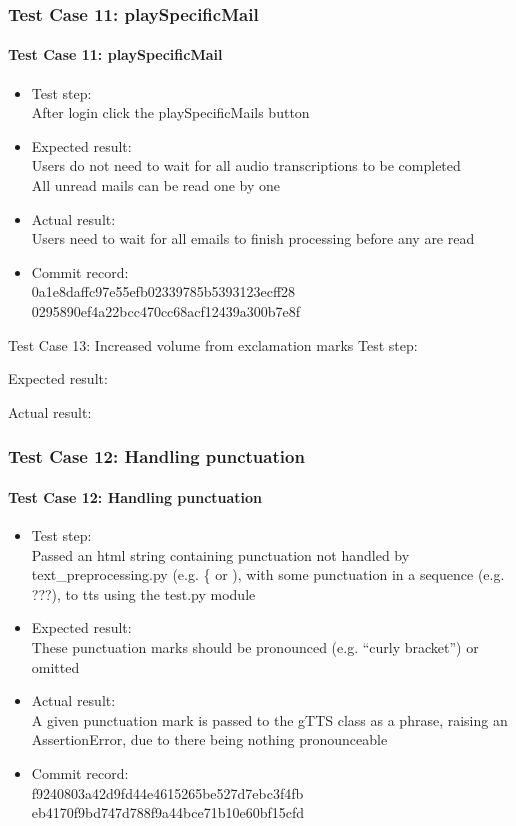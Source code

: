 \documentclass{article}
\begin{document}
\subsubsection{Test Case 11:   playSpecificMail}
\paragraph{Test Case 11:   playSpecificMail}
\begin{itemize}
\item Test step: \\
    After login click the playSpecificMails button
\item Expected result: \\
    Users do not need to wait for all audio transcriptions to be completed \\ 
    All unread mails can be read one by one
\item Actual result: \\
    Users need to wait for all emails to finish processing before any are read
\item Commit record: \\
    0a1e8daffc97e55efb02339785b5393123ecff28 
    0295890ef4a22bcc470cc68acf12439a300b7e8f
\end{itemize}

Test Case 13: Increased volume from exclamation marks
Test step:

Expected result:

Actual result:




\subsubsection{Test Case 12: Handling punctuation}
\paragraph{Test Case 12: Handling punctuation}
\begin{itemize}
\item Test step: \\
    Passed an html string containing punctuation not handled by text\_preprocessing.py (e.g. \{ or \@), with some punctuation in a sequence (e.g. ???), to tts using the test.py module
\item Expected result: \\
    These punctuation marks should be pronounced (e.g. “curly bracket”) or omitted
\item Actual result: \\
    A given punctuation mark is passed to the gTTS class as a phrase, raising an AssertionError, due to there being nothing pronounceable
\item Commit record: \\
    f9240803a42d9fd44e4615265be527d7ebc3f4fb
    eb4170f9bd747d788f9a44bce71b10e60bf15cfd
\end{itemize}
\end{document}
